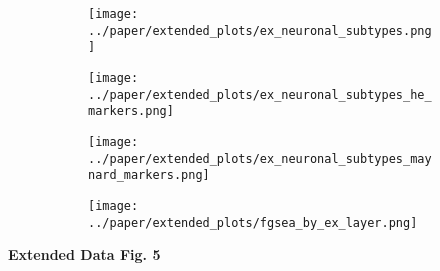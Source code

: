 \begin{figure}[H]
    \begin{subfigure}[t]{.3\textwidth}
        \caption{}
        \texttt{[image: ../paper/extended\_plots/ex\_neuronal\_subtypes.png]}        
    \end{subfigure}
    \begin{subfigure}[t]{.3\textwidth}
        \caption{}
        \texttt{[image: ../paper/extended\_plots/ex\_neuronal\_subtypes\_he\_markers.png]}        
    \end{subfigure}
    \begin{subfigure}[t]{.3\textwidth}
        \caption{}
        \texttt{[image: ../paper/extended\_plots/ex\_neuronal\_subtypes\_maynard\_markers.png]}        
    \end{subfigure}
    \begin{subfigure}[t]{0.8\textwidth}
        \caption{}
        \texttt{[image: ../paper/extended\_plots/fgsea\_by\_ex\_layer.png]}        
    \end{subfigure}
\end{figure}
\textbf{Extended Data Fig. 5}